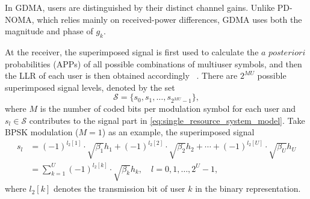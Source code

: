 In GDMA, users are distinguished by their distinct channel gains. Unlike PD-NOMA, which relies mainly on received-power differences, GDMA uses both the magnitude and phase of $g_k$.

\begin{table}[htbp]
        \centering
        \caption{Mapping rules for superimposed signal in the case of $M = 1$ and $U = 2$}
        \renewcommand{\arraystretch}{1.5} %
        \setlength{\tabcolsep}{10pt}      %
      
      \label{table:superimposed-bpsk-u2}
\end{table}

At the receiver, the superimposed signal is first used to calculate the $a$ $posteriori$ probabilities (APPs) of all possible combinations of multiuser symbols, and then the LLR of each user is then obtained accordingly ~\cite{hsu2019gain}. There are $2^{MU}$ possible superimposed signal levels, denoted by the set
\begin{equation}
    \mathcal{S}
    =
    \{s_0,s_1,\ldots,s_{2^{MU}-1}\},
\end{equation}
where $M$ is the number of coded bits per modulation symbol for each user and $s_l\in\mathcal{S}$ contributes to the signal part in \eqref{eq:single_resource_system_model}. 
Take BPSK modulation ($M=1$) as an example, the superimposed signal 
\begin{equation}
  \begin{split}
    s_l &= (-1)^{l_2[1]} \cdot \sqrt{\beta_1}h_1 + (-1)^{l_2[2]} \cdot \sqrt{\beta_2}h_2 + \cdots + (-1)^{l_2[U]} \cdot \sqrt{\beta_U}h_U \\
    &= \sum_{k=1}^{U} (-1)^{l_2[k]} \cdot \sqrt{\beta_k}h_k, \quad l=0,1,\ldots,2^U-1,
  \end{split}
\end{equation}
where $l_2[k]$ denotes the transmission bit of user $k$ in the binary representation. 

